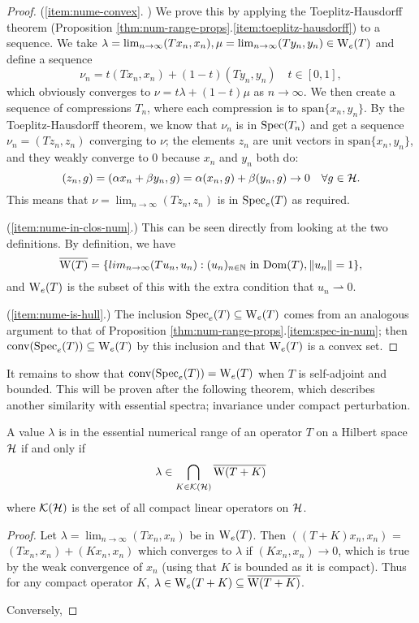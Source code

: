 \documentclass[../main.tex]{subfiles}
\begin{document}
\begin{proof}
(\ref{item:nume-convex}. \cite{bogli2020essential}) We prove this by applying
the Toeplitz-Hausdorff theorem (Proposition
\ref{thm:num-range-props}.\ref{item:toeplitz-hausdorff}) to a sequence.
We take $\lambda = \lim_{n \rightarrow \infty}(Tx_n, x_n), \mu = \lim_{n
\rightarrow \infty}(Ty_n, y_n) \in \mathrm{W}_e(T)$ and define a sequence
$$\nu_n = t(Tx_n, x_n) + (1-t)(Ty_n, y_n) \quad t \in [0, 1],$$ which
obviously converges to $\nu = t\lambda + (1-t)\mu$ as 
$n \rightarrow \infty$.
We then create a sequence of compressions $T_n$, where each compression is to
$\text{span}\{x_n, y_n\}$. By the Toeplitz-Hausdorff theorem, we know
that $\nu_n$ is in $\mathrm{Spec}(T_n)$ and get a sequence $\nu_n = (Tz_n, z_n)$
converging to $\nu$; the elements $z_n$ are unit vectors in
$\text{span}\{x_n, y_n\}$, and they weakly converge to 0 because $x_n$
and $y_n$ both do:
$$(z_n, g) = (\alpha x_n + \beta y_n, g) = \alpha(x_n, g) + \beta(y_n, g) \rightarrow 0 \quad \forall g \in \mathcal{H}.$$
This means that $\nu = \lim_{n \rightarrow \infty}(Tz_n, z_n)$ is in $\mathrm{Spec}_e(T)$ as required.

(\ref{item:nume-in-clos-num}.) This can be seen directly from looking at the two
definitions. By definition, we have
  $$\overline{\mathrm{W}(T)} = \{lim_{n \rightarrow \infty}( Tu_n, u_n ) 
			   : (u_n)_{n \in \mathbb{N}}\text{ in } \mathrm{Dom}(T),
			   \|u_n\|=1\},$$
and $\mathrm{W}_e(T)$ is the subset of this with the extra condition
that $u_n \rightharpoonup 0$.

(\ref{item:nume-is-hull}.) The inclusion $\mathrm{Spec}_e(T) \subseteq \mathrm{W}_e(T)$ comes
from an analogous argument to that of Proposition
\ref{thm:num-range-props}.\ref{item:spec-in-num}; then
$\mathrm{conv}(\mathrm{Spec}_e(T)) \subseteq \mathrm{W}_e(T)$
by this inclusion and that $\mathrm{W}_e(T)$ is a convex set.
\end{proof}
It remains to show that $\mathrm{conv}(\mathrm{Spec}_e(T)) = \mathrm{W}_e(T)$ when $T$ is self-adjoint
and bounded. This will be proven after the following theorem, which describes
another similarity with essential spectra; invariance under compact
perturbation.

\begin{theorem}
  A value $\lambda$ is in the essential numerical range of an operator $T$ on a
  Hilbert space $\mathcal{H}$ if and only if
    $$\lambda \in \bigcap_{K \in \mathcal{K}(\mathcal{H})} \overline{\mathrm{W}(T+K)}$$
  where $\mathcal{K}(\mathcal{H})$ is the set of all compact linear operators on $\mathcal{H}$. 
\end{theorem}
\begin{proof}
Let $\lambda = \lim_{n \rightarrow \infty}(Tx_n, x_n)$ be in $\mathrm{W}_e(T)$. Then
$((T+K)x_n, x_n)$ = $(Tx_n, x_n) + (Kx_n, x_n)$ which converges to
$\lambda$ if $(Kx_n, x_n) \rightarrow 0$, which is true by the weak
convergence of $x_n$ (using that $K$ is bounded as it is compact). Thus
for any compact operator $K$, 
$\lambda \in \mathrm{W}_e(T+K) \subseteq \overline{\mathrm{W}(T+K)}$.

Conversely, %
\end{proof}
\end{document}
